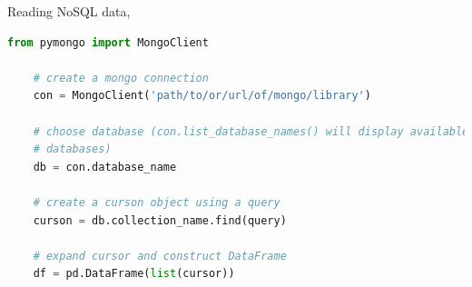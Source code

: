 \documentclass{article}
\theoremstyle{mytheoremstyle}
\theoremstyle{mytheoremstyle}
\theoremstyle{myproblemstyle}
\begin{document}
    \noindent Reading NoSQL data,
    \begin{lstlisting}[language=Python]
    from pymongo import MongoClient

    # create a mongo connection
    con = MongoClient('path/to/or/url/of/mongo/library')

    # choose database (con.list_database_names() will display available
    # databases)
    db = con.database_name

    # create a curson object using a query
    curson = db.collection_name.find(query)

    # expand cursor and construct DataFrame
    df = pd.DataFrame(list(cursor))
    \end{lstlisting}
    
\end{document}
